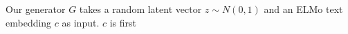 Our generator $G$ takes a random latent vector $z \sim N(0, 1)$ and an ELMo text embedding $c$ as input. $c$ is first 
